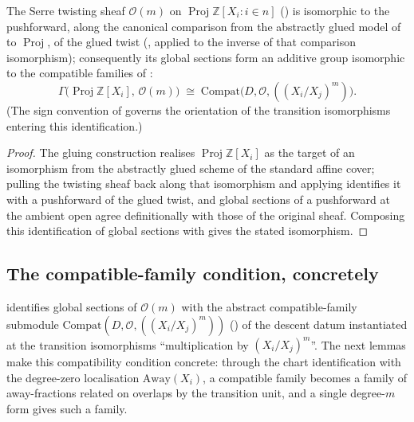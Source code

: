 \begin{lemma}
  \label{lem:serre_twist_sections_compatible}
  \leanok
  The Serre twisting sheaf \(\mathcal O(m)\) on
  \(\operatorname{Proj} \mathbb Z[X_i : i \in n]\) ()
  is isomorphic to the pushforward, along the canonical comparison from the
  abstractly glued model of  to
  \(\operatorname{Proj}\), of the glued twist
  (, applied to the inverse of that
  comparison isomorphism); consequently its global sections form an
  additive group isomorphic to the compatible families of
  :
  \[
    \Gamma\bigl(\operatorname{Proj}\mathbb Z[X_i],\, \mathcal O(m)\bigr)
      \;\cong\; \mathrm{Compat}\bigl(D, \mathcal O, ((X_i/X_j)^m)\bigr).
  \]
  (The sign convention of  governs the
  orientation of the transition isomorphisms entering this identification.)
\end{lemma}
\begin{proof}\leanok
  The gluing construction realises \(\operatorname{Proj}\mathbb Z[X_i]\) as
  the target of an isomorphism from the abstractly glued scheme of the
  standard affine cover; pulling the twisting sheaf back along that
  isomorphism and applying 
  identifies it with a pushforward of the glued twist, and global sections
  of a pushforward at the ambient open agree definitionally with those of
  the original sheaf. Composing this identification of global sections with
   gives the stated isomorphism.
\end{proof}

\subsection{The compatible-family condition, concretely}
\label{subsec:serre_twist_compatible_condition}

 identifies global sections of
\(\mathcal O(m)\) with the abstract compatible-family submodule
\(\mathrm{Compat}(D, \mathcal O, ((X_i/X_j)^m))\)
() of the descent datum instantiated at the
transition isomorphisms ``multiplication by \((X_i/X_j)^m\)''. The next
lemmas make this compatibility condition concrete: through the chart
identification with the degree-zero localisation \(\mathrm{Away}(X_i)\), a
compatible family becomes a family of away-fractions related on overlaps by
the transition unit, and a single degree-\(m\) form gives such a family.

